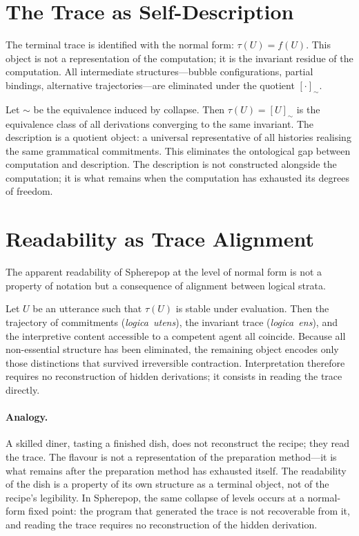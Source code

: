 \documentclass[12pt, oneside]{amsbook}
\theoremstyle{plain}
\theoremstyle{definition}
\theoremstyle{remark}
\newcommand{\evalf}{f}
\newcommand{\trace}{\tau}
\newcommand{\tequiv}{\sim}
\newcommand{\utens}{\textit{logica~utens}}
\newcommand{\ens}{\textit{logica~ens}}
\begin{document}
\section{The Trace as Self-Description}
\label{sec:pec:self-description}

The terminal trace is identified with the normal form: $\trace(U) = \evalf(U)$.
This object is not a representation of the computation; it is the invariant
residue of the computation. All intermediate structures---bubble configurations,
partial bindings, alternative trajectories---are eliminated under the quotient
$[\cdot]_{\tequiv}$.

Let $\tequiv$ be the equivalence induced by collapse. Then
$\trace(U) = [U]_{\tequiv}$ is the equivalence class of all derivations
converging to the same invariant. The description is a quotient object: a
universal representative of all histories realising the same grammatical
commitments. This eliminates the ontological gap between computation and
description. The description is not constructed alongside the computation; it is
what remains when the computation has exhausted its degrees of freedom.

\section{Readability as Trace Alignment}
\label{sec:pec:readability}

The apparent readability of Spherepop at the level of normal form is not a
property of notation but a consequence of alignment between logical strata.

Let $U$ be an utterance such that $\trace(U)$ is stable under evaluation. Then
the trajectory of commitments (\utens{}), the invariant trace (\ens{}), and
the interpretive content accessible to a competent agent all coincide. Because
all non-essential structure has been eliminated, the remaining object encodes
only those distinctions that survived irreversible contraction. Interpretation
therefore requires no reconstruction of hidden derivations; it consists in
reading the trace directly.

\paragraph{Analogy.}
A skilled diner, tasting a finished dish, does not reconstruct the recipe; they read the trace. The flavour is not a representation of the preparation method---it is what remains after the preparation method has exhausted itself. The readability of the dish is a property of its own structure as a terminal object, not of the recipe's legibility. In Spherepop, the same collapse of levels occurs at a normal-form fixed point: the program that generated the trace is not recoverable from it, and reading the trace requires no reconstruction of the hidden derivation.
\end{document}
